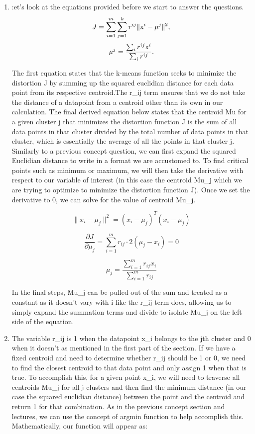 \documentclass[twoside,10pt]{article}
\begin{document}
\begin{enumerate}

\item :et's look at the equations provided before we start to answer the questions.
\begin{equation}
J =\sum_{i=1}^m\sum_{j=1}^k r^{ij} \|\text x^i-\mu^j\|^2,
\label{J_def}
\end{equation}
$$\mu^j=\frac{\sum_i r^{ij} \text x^i}{\sum_i r^{ij}}.$$

The first equation states that the k-means function seeks to minimize the distortion J by summing up
the squared euclidian distance for each data point from its respective centroid.The r_ij term ensures that
we do not take the distance of a datapoint from a centroid other than its own in our calculation. The final
derived equation below states that the centroid Mu for a given cluster j that minimizes the distortion
function J is the sum of all data points in that cluster divided by the total number of data points in that
cluster, which is essentially the average of all the points in that cluster j. Similarly to a previous concept
question, we can first expand the squared Euclidian distance to write in a format we are accustomed to. To
find critical points such as minimum or maximum, we will then take the derivative with respect to our variable
of interest (in this case the centroid Mu_j which we are trying to optimize to minimize the distortion function
J). Once we set the derivative to 0, we can solve for the value of centroid Mu_j.

\[
\| x_i - \mu_j \|^2 = (x_i - \mu_j)^T(x_i - \mu_j)
\]

\[
\frac{\partial J}{\partial \mu_j} = \sum_{i=1}^{m} r_{ij} \cdot 2(\mu_j - x_i) = 0
\]

\[
\mu_j = \frac{\sum_{i=1}^{m} r_{ij} x_i}{\sum_{i=1}^{m} r_{ij}}
\]

In the final steps, Mu_j can be pulled out of the sum and treated as a constant as it doesn't vary with i
like the r_ij term does, allowing us to simply expand the summation terms and divide to isolate Mu_j on the
left side of the equation.

\item The variable r_ij is 1 when the datapoint x_i belongs to the jth cluster and 0 when it doesn't as
mentioned in the first part of the section. If we have a fixed centroid and need to determine whether
r_ij should be 1 or 0, we need to find the closest centroid to that data point and only assign 1 when
that is true. To accomplish this, for a given point x_i, we will need to traverse all centroids Mu_j for all
j clusters and then find the minimum distance (in our case the squared euclidian distance) between the point
and the centroid and return 1 for that combination. As in the previous concept section and lectures, we can use the
concept of argmin function to help accomplish this. Mathematically, our function will appear as:


\end{enumerate}
\end{document}
